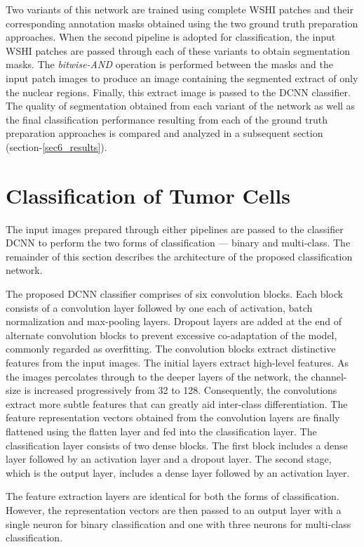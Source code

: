 \documentclass{comjnl}
\begin{document}
Two variants of this network are trained using complete WSHI patches and their corresponding annotation masks obtained using the two ground truth preparation approaches. When the second pipeline is adopted for classification, the input WSHI patches are passed through each of these variants to obtain segmentation masks. The \emph{bitwise-AND} operation is performed between the masks and the  input patch images to produce an image containing the segmented extract of only the nuclear regions. Finally, this extract image is passed to the DCNN classifier. The quality of segmentation obtained from each variant of the network as well as the final classification performance resulting from each of the ground truth preparation approaches is compared and analyzed in a subsequent section (section-\ref{sec6_results}).

\section{Classification of Tumor Cells}
\label{sec5_classifier}

The input images prepared through either pipelines are passed to the classifier DCNN to perform the two forms of classification --- binary and multi-class. The remainder of this section describes the architecture of the proposed classification network.

The proposed DCNN classifier comprises of six convolution blocks. Each block consists of a convolution layer followed by one each of activation, batch normalization and max-pooling layers. Dropout layers are added at the end of alternate convolution blocks to prevent excessive co-adaptation of the model, commonly regarded as overfitting. The convolution blocks extract distinctive features from the input images. The initial layers extract high-level features. As the images percolates through to the deeper layers of the network, the channel-size is increased progressively from 32 to 128. Consequently, the convolutions extract more subtle features that can greatly aid inter-class differentiation. The feature representation vectors obtained from the convolution layers are finally flattened using the flatten layer and fed into the classification layer. The classification layer consists of two dense blocks. The first block includes a dense layer followed by an activation layer and a dropout layer. The second stage, which is the output layer, includes a dense layer followed by an activation layer. 

The feature extraction layers are identical for both the forms of classification. However, the representation vectors are then passed to an output layer with a single neuron for binary classification and one with three neurons for multi-class classification.
\end{document}

